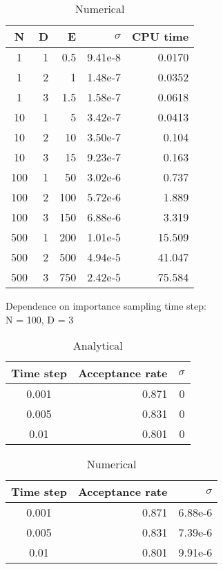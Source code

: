 \documentclass[english, a4paper]{article}
\begin{document}
\begin{table}[H]
  \centering
  \begin{tabular}{ | c | r | r | r | r |}
    \hline
    N& D& E& $\sigma$& CPU time \\*
    \hline
    1& 1& 0.5& 9.41e-8& 0.0170 \\*
    \hline
    1& 2& 1& 1.48e-7&  0.0352\\*
    \hline
    1& 3& 1.5& 1.58e-7&  0.0618\\*
    \hline
    10& 1& 5& 3.42e-7&  0.0413\\*
    \hline
    10& 2& 10& 3.50e-7&  0.104\\*
    \hline
    10& 3& 15& 9.23e-7&  0.163\\*
    \hline
    100& 1& 50& 3.02e-6&  0.737\\*
    \hline
    100& 2& 100& 5.72e-6&  1.889\\*
    \hline
    100& 3& 150& 6.88e-6&  3.319\\*
    \hline
    500& 1& 200& 1.01e-5&  15.509\\*
    \hline
    500& 2& 500& 4.94e-5&  41.047\\*
    \hline
    500& 3& 750& 2.42e-5&  75.584\\*
    \hline
  \end{tabular}
  \caption{Numerical}
  \label{tab:Tabell1}
\end{table}


Dependence on importance sampling time step:\\
N = 100, D = 3


\begin{table}[H]
  \centering
  \begin{tabular}{ | c | r | r |}
    \hline
    Time step& Acceptance rate& $\sigma$ \\*
    \hline
    0.001& 0.871& 0 \\*
    \hline
    0.005& 0.831& 0 \\*
    \hline
    0.01&  0.801& 0 \\*
    \hline
  \end{tabular}
  \caption{Analytical}
  \label{tab:Tabell1}
\end{table}

\begin{table}[H]
  \centering
  \begin{tabular}{ | c | r | r |}
    \hline
    Time step& Acceptance rate& $\sigma$ \\*
    \hline
    0.001& 0.871& 6.88e-6 \\*
    \hline
    0.005& 0.831& 7.39e-6 \\*
    \hline
    0.01&  0.801& 9.91e-6 \\*
    \hline
  \end{tabular}
  \caption{Numerical}
  \label{tab:Tabell1}
\end{table}
\end{document}
